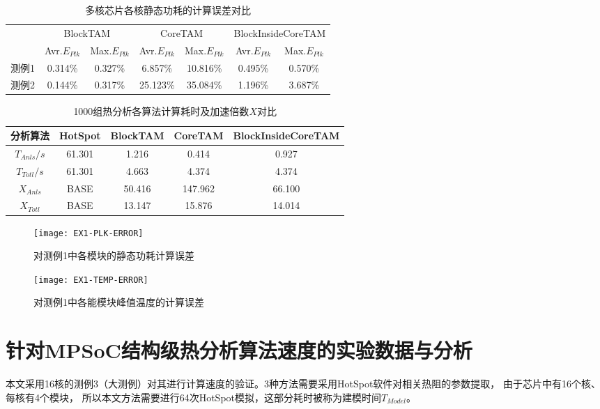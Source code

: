 \begin{table}
\centering
\caption{多核芯片各核静态功耗的计算误差对比}
\begin{tabular}{c c c c c c c}
\hline\hline
 & \multicolumn{2}{c}{BlockTAM} & \multicolumn{2}{c}{CoreTAM} & \multicolumn{2}{c}{BlockInsideCoreTAM} \\
 & Avr.$E_{Plk}$ & Max.$E_{Plk}$ & Avr.$E_{Plk}$ & Max.$E_{Plk}$ & Avr.$E_{Plk}$ & Max.$E_{Plk}$ \\
\hline
测例1 & 0.314\% & 0.327\% & 6.857\% & 10.816\% & 0.495\% & 0.570\% \\
\hline
测例2 & 0.144\% & 0.317\% & 25.123\% & 35.084\% & 1.196\% & 3.687\% \\
\hline
\end{tabular}
\label{tab:chap5:power-leakage-error}
\end{table}

\begin{table}
\centering
\caption{1000组热分析各算法计算耗时及加速倍数$X$对比}
\begin{tabular}{c c c c c}
\hline\hline
分析算法 & HotSpot & BlockTAM & CoreTAM & BlockInsideCoreTAM \\ [0.5ex]
\hline
$T_{Anls}/s$ & 61.301 & 1.216 & 0.414 & 0.927 \\
\hline
$T_{Totl}/s$ & 61.301 & 4.663 & 4.374 & 4.374 \\
\hline
$X_{Anls}$ & BASE & 50.416 & 147.962 & 66.100 \\
\hline
$X_{Totl}$ & BASE & 13.147 & 15.876 & 14.014 \\
\hline
\end{tabular}
\label{tab:chap5:time-speedup}
\end{table}

\begin{figure}[H]
  \centering
  \texttt{[image: EX1-PLK-ERROR]}
  \caption{对测例1中各模块的静态功耗计算误差}
  \label{fig:ex1-plk-error}
\end{figure}
\begin{figure}[H]
  \centering
  \texttt{[image: EX1-TEMP-ERROR]}
  \caption{对测例1中各能模块峰值温度的计算误差}
  \label{fig:ex1-temp-error}
\end{figure}


\section{针对MPSoC结构级热分析算法速度的实验数据与分析}
\label{exp-speedup}
本文采用16核的测例3（大测例）对其进行计算速度的验证。3种方法需要采用HotSpot软件对相关热阻的参数提取， 由于芯片中有16个核、每核有4个模块， 所以本文方法需要进行64次HotSpot模拟，这部分耗时被称为建模时间$T_{Model}$。

